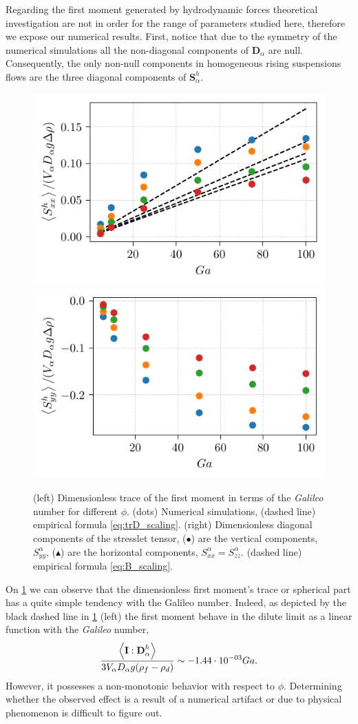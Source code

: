 Regarding the first moment generated by hydrodynamic forces theoretical investigation are not in order for the range of parameters studied here, therefore we expose our numerical results. 
First, notice that due to the symmetry of the numerical simulations all the non-diagonal components of $\textbf{D}_\alpha$ are null.
Consequently, the only non-null components in homogeneous rising suspensions flows are the three diagonal components of $\textbf{S}_\alpha^h$.
\begin{figure}[h!]
    \centering
    \includegraphics[height=0.3\textwidth]{image/HOMOGENEOUS/fPA/Sxx.pdf}
    \includegraphics[height=0.3\textwidth]{image/HOMOGENEOUS/fPA/Syy.pdf}
    \caption{(left) Dimensionless trace of the first moment in terms of the \textit{Galileo} number for different $\phi$. (dots) Numerical simulations, (dashed line) empirical formula \ref{eq:trD_scaling}.
    (right) Dimensionless diagonal components of the stresslet tensor, ($\bullet$) are the vertical components, $S^\alpha_{yy}$, ($\blacktriangle$) are the horizontal components, $S^\alpha_{xx} = S^\alpha_{zz}$. (dashed line) empirical formula \ref{eq:B_scaling}.}
    \label{fig:trD_Sx_Sy}
\end{figure}
On \ref{fig:trD_Sx_Sy} we can observe that the dimensionless first moment's trace or spherical part has a quite simple tendency with the Galileo number.
Indeed, as depicted by the black dashed line in \ref{fig:trD_Sx_Sy} (left) the first moment behave in the dilute limit as a linear function with the \textit{Galileo} number, 
\begin{equation}
    \frac
    {\left<\textbf{I}:\textbf{D}_\alpha^h\right>}
    {3V_\alpha D_\alpha g (\rho_f - \rho_d)}
    \sim  -1.44\cdot 10^{-03} Ga.
    \label{eq:trD_scaling}
\end{equation}
However, it possesses a non-monotonic behavior with respect to $\phi$. 
Determining whether the observed effect is a result of a numerical artifact or due to physical phenomenon is difficult to figure out.

